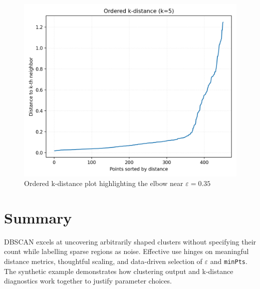 ﻿\documentclass[12pt]{article}
\begin{document}
\begin{figure}[H]
  \centering
  \includegraphics[width=0.8\linewidth]{dbscan_k_distance.png}
  \caption{Ordered k-distance plot highlighting the elbow near \(\varepsilon=0.35\)}
  \label{fig:dbscan_k_distance}
\end{figure}

\FloatBarrier
\section{Summary}
DBSCAN excels at uncovering arbitrarily shaped clusters without specifying their count while labelling sparse regions as noise. Effective use hinges on meaningful distance metrics, thoughtful scaling, and data-driven selection of \(\varepsilon\) and \texttt{minPts}. The synthetic example demonstrates how clustering output and k-distance diagnostics work together to justify parameter choices.
\end{document}
